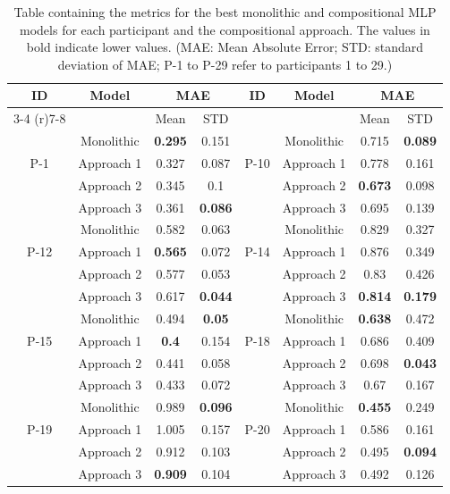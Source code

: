 \begin{table}[htbp]
 \caption{Table containing the metrics for the best monolithic and compositional MLP models for each participant and the compositional approach. The values in bold indicate lower values. (MAE: Mean Absolute Error; STD: standard deviation of MAE; P-1 to P-29 refer to participants 1 to 29.)}
 \label{tab:performance_comparison}

 \begin{tabular}{cccccccc}
 \hline
 \multirow{2}{*}{ID} & Model & \multicolumn{2}{c}{MAE} & \multirow{2}{*}{ID} & Model & \multicolumn{2}{c}{MAE} \\
 \cmidrule(r){3-4} 
 \cmidrule(r){7-8} 
 &  & Mean & STD & &  & Mean & STD  \\
 \hline

 \multirow{3}{*}{P-1}  & Monolithic &\textbf{ 0.295} & 0.151 &
 \multirow{3}{*}{P-10}   & Monolithic & 0.715 & \textbf{0.089} \\
 & Approach 1 & 0.327 & 0.087  & 
 & Approach 1 & 0.778 & 0.161 \\
 & Approach 2 & 0.345 & 0.1 & 
 & Approach 2 & \textbf{0.673 }& 0.098 \\
 & Approach 3 & 0.361 &\textbf{ 0.086} & 
 & Approach 3 & 0.695 & 0.139 \\
 \hline
 \multirow{3}{*}{P-12}  & Monolithic & 0.582 & 0.063 & 
 \multirow{3}{*}{P-14}  & Monolithic & 0.829 & 0.327  \\
 & Approach 1 & \textbf{0.565} & 0.072 &
 & Approach 1 & 0.876 & 0.349  \\
 & Approach 2 & 0.577 & 0.053 & 
 & Approach 2 & 0.83 & 0.426 \\
 & Approach 3 & 0.617 & \textbf{0.044} & 
 & Approach 3 & \textbf{0.814} & \textbf{0.179} \\
 \hline

 \multirow{3}{*}{P-15}  & Monolithic & 0.494 & \textbf{0.05} & 
 \multirow{3}{*}{P-18}  & Monolithic & \textbf{0.638} & 0.472  \\
 & Approach 1 & \textbf{0.4} & 0.154 &
 & Approach 1 & 0.686 & 0.409  \\
 & Approach 2 & 0.441 & 0.058 & 
 & Approach 2 & 0.698 & \textbf{0.043} \\
 & Approach 3 & 0.433 & 0.072 & 
 & Approach 3 & 0.67 & 0.167 \\
 \hline


 \multirow{3}{*}{P-19}  & Monolithic & 0.989 & \textbf{0.096} &
 \multirow{3}{*}{P-20}   & Monolithic & \textbf{0.455} & 0.249 \\
 & Approach 1 & 1.005 & 0.157  & 
 & Approach 1 & 0.586 & 0.161 \\
 & Approach 2 & 0.912 & 0.103 & 
 & Approach 2 & 0.495 & \textbf{0.094} \\
 & Approach 3 & \textbf{0.909} & 0.104 & 
 & Approach 3 & 0.492 & 0.126 \\


\end{tabular}
\end{table}
